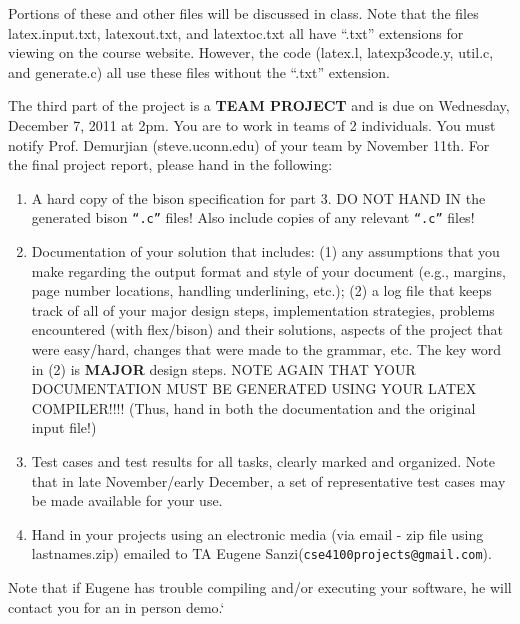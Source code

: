 \noindent
Portions of these and other files will be discussed in class.  
Note that the files latex.input.txt, latexout.txt, and latextoc.txt
all have ``.txt'' extensions for viewing on the course website.  However,
the code (latex.l, latexp3code.y, util.c, and generate.c) all use
these files without the ``.txt'' extension.

The third part of the project is a {\bf TEAM PROJECT} and is due on Wednesday, 
December 7, 2011 at 2pm.  You are to work in teams of 2 individuals.  
You must notify Prof. Demurjian (steve\@engr.uconn.edu) of your team by November 11th.  
For the final project report, please hand in the following:
\begin{enumerate}
\item A hard copy of the bison specification for part 3.  DO NOT HAND 
      IN the generated bison {\tt ``.c''} files!  
      Also include copies of any relevant {\tt ``.c''} files! 
\item Documentation of your solution that includes: (1) any assumptions that you
      make regarding the output format and style of your document (e.g., margins,
      page number locations, handling underlining, etc.);  (2) a log file that 
      keeps track of all of your major design steps, implementation strategies, 
      problems encountered (with flex/bison) and their solutions, aspects of the 
      project that were easy/hard, changes that were made to the grammar, etc.  
      The key word in (2) is {\bf MAJOR} design steps.  NOTE AGAIN THAT
      YOUR DOCUMENTATION MUST BE GENERATED USING YOUR LATEX COMPILER!!!!
      (Thus, hand in both the documentation and the original input file!)
\item Test cases and test results for all tasks, clearly marked and organized.
      Note that in late November/early December, a set of representative test
      cases may be made available for your use.
\item Hand in your projects using an electronic media (via email - zip file using lastnames.zip)
      emailed to TA Eugene Sanzi({\tt cse4100projects@gmail.com}). 
\end{enumerate}
\noindent
 Note that if Eugene has trouble compiling and/or executing your software, 
he will contact you for an in person demo.`

